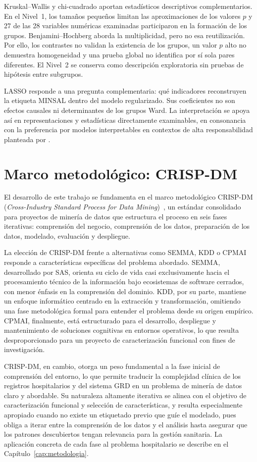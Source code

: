 Kruskal--Wallis y chi-cuadrado aportan estadísticos descriptivos complementarios.
En el Nivel~1, los tamaños pequeños limitan las aproximaciones de los valores
$p$ y 27 de las 28 variables numéricas examinadas participaron en la formación
de los grupos. Benjamini--Hochberg aborda la multiplicidad, pero no esa
reutilización. Por ello, los contrastes no validan la existencia de los grupos,
un valor $p$ alto no demuestra homogeneidad y una prueba global no identifica
por sí sola pares diferentes. El Nivel~2 se conserva como descripción
exploratoria sin pruebas de hipótesis entre subgrupos.

LASSO responde a una pregunta complementaria: qué indicadores reconstruyen la
etiqueta MINSAL dentro del modelo regularizado. Sus coeficientes no son efectos
causales ni determinantes de los grupos Ward. La interpretación se apoya así en
representaciones y estadísticas directamente examinables, en consonancia con
la preferencia por modelos interpretables en contextos de alta responsabilidad
planteada por \citet{Rudin2019}.

\section{Marco metodológico: CRISP-DM}
\label{sec:crisp-dm}

El desarrollo de este trabajo se fundamenta en el marco metodológico CRISP-DM
(\textit{Cross-Industry Standard Process for Data Mining})~\citep{Chapman2000}, un estándar
consolidado para proyectos de minería de datos que estructura el proceso en seis
fases iterativas: comprensión del negocio, comprensión de los datos, preparación
de los datos, modelado, evaluación y despliegue.

La elección de CRISP-DM frente a alternativas como SEMMA, KDD o CPMAI responde a
características específicas del problema abordado. SEMMA, desarrollado por SAS,
orienta su ciclo de vida casi exclusivamente hacia el procesamiento técnico de la
información bajo ecosistemas de software cerrados, con menor énfasis en la
comprensión del dominio. KDD, por su parte, mantiene un enfoque informático
centrado en la extracción y transformación, omitiendo una fase metodológica
formal para entender el problema desde su origen empírico. CPMAI, finalmente, está
estructurado para el desarrollo, despliegue y mantenimiento de soluciones
cognitivas en entornos operativos, lo que resulta desproporcionado para un
proyecto de caracterización funcional con fines de investigación.

CRISP-DM, en cambio, otorga un peso fundamental a la fase inicial de comprensión
del entorno, lo que permite traducir la complejidad clínica de los registros
hospitalarios y del sistema GRD en un problema de minería de datos claro y
abordable. Su naturaleza altamente iterativa se alinea con el objetivo de
caracterización funcional y selección de características, y resulta
especialmente apropiado cuando no existe un etiquetado previo que guíe el
modelado, pues obliga a iterar entre la comprensión de los datos y el análisis
hasta asegurar que los patrones descubiertos tengan relevancia para la gestión
sanitaria. La aplicación concreta de cada fase al problema hospitalario se
describe en el Capítulo~\ref{cap:metodologia}.
